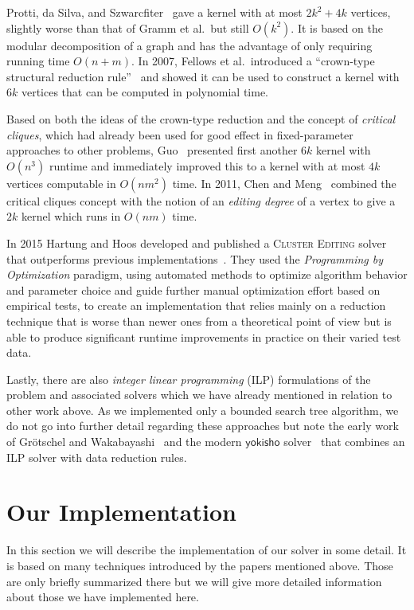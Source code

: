 \documentclass[12pt,oneside,english,parskip=full,headings=small]{scrbook}
\theoremstyle{definition}
\begin{document}
Protti, da Silva, and Szwarcfiter~\cite{Protti} gave a kernel with at most $2k^2 + 4k$
vertices, slightly worse than that of Gramm et al.\ but still $O(k^2)$. It is based on the modular
decomposition of a graph and has the advantage of only requiring running time $O(n + m)$. In 2007,
Fellows et al.\ introduced a ``crown-type structural reduction rule''~\cite{Fellows} and showed it
can be used to construct a kernel with $6k$ vertices that can be computed in polynomial time.

Based on both the ideas of the crown-type reduction and the concept of \emph{critical cliques},
which had already been used for good effect in fixed-parameter approaches to other problems,
Guo~\cite{Guo} presented first another $6k$ kernel with $O(n^3)$ runtime and immediately improved
this to a kernel with at most $4k$ vertices computable in $O(nm^2)$ time. In 2011, Chen and
Meng~\cite{ChenMeng} combined the critical cliques concept with the notion of an \emph{editing
degree} of a vertex to give a $2k$ kernel which runs in $O(nm)$ time.

In 2015 Hartung and Hoos developed and published a \textsc{Cluster Editing} solver that outperforms
previous implementations~\cite{HartungHoos}. They used the \emph{Programming by Optimization}
paradigm, using automated methods to optimize algorithm behavior and parameter choice and guide
further manual optimization effort based on empirical tests, to create an implementation that relies
mainly on a reduction technique that is worse than newer ones from a theoretical point of view but
is able to produce significant runtime improvements in practice on their varied test data.

Lastly, there are also \emph{integer linear programming} (ILP) formulations of the problem and
associated solvers which we have already mentioned in relation to other work above. As we
implemented only a bounded search tree algorithm, we do not go into further detail regarding these
approaches but note the early work of Grötschel and Wakabayashi~\cite{CuttingPlane} and the modern
$\mathsf{yokisho}$ solver~\cite{yokisho} that combines an ILP solver with data reduction rules.

\chapter{Our Implementation}

In this section we will describe the implementation of our solver in some detail. It is based on
many techniques introduced by the papers mentioned above. Those are only briefly summarized there
but we will give more detailed information about those we have implemented here.
\end{document}

